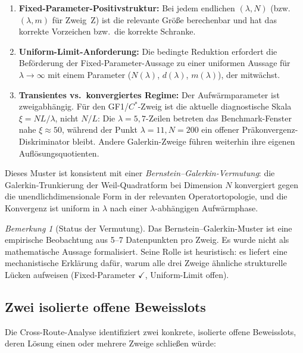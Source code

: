 \documentclass[12pt,a4paper]{article}
\theoremstyle{definition}
\theoremstyle{remark}
\newtheorem{remark}[theorem]{Bemerkung}
\begin{document}
\begin{enumerate}
  \item \textbf{Fixed-Parameter-Positivstruktur:} Bei jedem endlichen
    $(\lambda, N)$ (bzw.\ $(\lambda, m)$ für Zweig~Z) ist die relevante
    Größe berechenbar und hat das korrekte Vorzeichen bzw.\ die korrekte
    Schranke.
  \item \textbf{Uniform-Limit-Anforderung:} Die bedingte Reduktion
    erfordert die Beförderung der Fixed-Parameter-Aussage zu einer
    uniformen Aussage für $\lambda \to \infty$ mit einem Parameter
    ($N(\lambda)$, $d(\lambda)$, $m(\lambda)$), der mitwächst.
  \item \textbf{Transientes vs.\ konvergiertes Regime:} Der Aufwärmparameter
    ist zweigabhängig. Für den GF1/$C^*$-Zweig ist die aktuelle diagnostische
    Skala $\xi=NL/\lambda$, nicht $N/L$: Die $\lambda=5,7$-Zeilen betreten
    das Benchmark-Fenster nahe $\xi\approx 50$, während der Punkt
    $\lambda=11,N=200$ ein offener Präkonvergenz-Diskriminator bleibt. Andere
    Galerkin-Zweige führen weiterhin ihre eigenen Auflösungsquotienten.
\end{enumerate}

Dieses Muster ist konsistent mit einer \emph{Bernstein--Galerkin-Vermutung}:
die Galerkin-Trunkierung der Weil-Quadratform bei Dimension $N$ konvergiert
gegen die unendlichdimensionale Form in der relevanten Operatortopologie,
und die Konvergenz ist uniform in $\lambda$ nach einer
$\lambda$-abhängigen Aufwärmphase.

\begin{remark}[Status der Vermutung]
Das Bernstein--Galerkin-Muster ist eine empirische Beobachtung aus
5--7 Datenpunkten pro Zweig. Es wurde nicht als mathematische Aussage
formalisiert. Seine Rolle ist heuristisch: es liefert eine mechanistische
Erklärung dafür, warum alle drei Zweige ähnliche strukturelle Lücken
aufweisen (Fixed-Parameter $\checkmark$, Uniform-Limit offen).
\end{remark}


\subsection{Zwei isolierte offene Beweisslots}

Die Cross-Route-Analyse identifiziert zwei konkrete, isolierte offene
Beweisslots, deren Lösung einen oder mehrere Zweige schließen würde:
\end{document}
